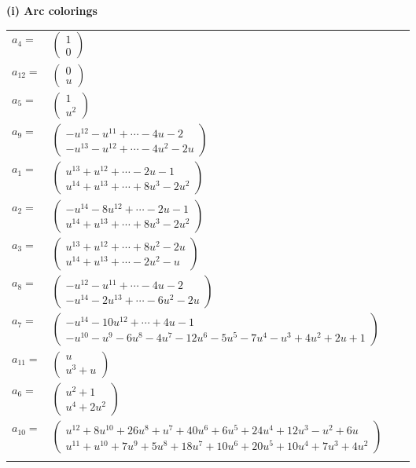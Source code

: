 \documentclass[1p]{elsarticle_modified}
\theoremstyle{definition}
\begin{document}
\flushleft \textbf{(i) Arc colorings}\\
\begin{tabular}{m{7pt} m{180pt} m{7pt} m{180pt} }
\flushright $a_{4}=$&$\begin{pmatrix}1\\0\end{pmatrix}$ \\
\flushright $a_{12}=$&$\begin{pmatrix}0\\u\end{pmatrix}$ \\
\flushright $a_{5}=$&$\begin{pmatrix}1\\u^2\end{pmatrix}$ \\
\flushright $a_{9}=$&$\begin{pmatrix}- u^{12}- u^{11}+\cdots-4 u-2\\- u^{13}- u^{12}+\cdots-4 u^2-2 u\end{pmatrix}$ \\
\flushright $a_{1}=$&$\begin{pmatrix}u^{13}+u^{12}+\cdots-2 u-1\\u^{14}+u^{13}+\cdots+8 u^3-2 u^2\end{pmatrix}$ \\
\flushright $a_{2}=$&$\begin{pmatrix}- u^{14}-8 u^{12}+\cdots-2 u-1\\u^{14}+u^{13}+\cdots+8 u^3-2 u^2\end{pmatrix}$ \\
\flushright $a_{3}=$&$\begin{pmatrix}u^{13}+u^{12}+\cdots+8 u^2-2 u\\u^{14}+u^{13}+\cdots-2 u^2- u\end{pmatrix}$ \\
\flushright $a_{8}=$&$\begin{pmatrix}- u^{12}- u^{11}+\cdots-4 u-2\\- u^{14}-2 u^{13}+\cdots-6 u^2-2 u\end{pmatrix}$ \\
\flushright $a_{7}=$&$\begin{pmatrix}- u^{14}-10 u^{12}+\cdots+4 u-1\\- u^{10}- u^9-6 u^8-4 u^7-12 u^6-5 u^5-7 u^4- u^3+4 u^2+2 u+1\end{pmatrix}$ \\
\flushright $a_{11}=$&$\begin{pmatrix}u\\u^3+u\end{pmatrix}$ \\
\flushright $a_{6}=$&$\begin{pmatrix}u^2+1\\u^4+2 u^2\end{pmatrix}$ \\
\flushright $a_{10}=$&$\begin{pmatrix}u^{12}+8 u^{10}+26 u^8+u^7+40 u^6+6 u^5+24 u^4+12 u^3- u^2+6 u\\u^{11}+u^{10}+7 u^9+5 u^8+18 u^7+10 u^6+20 u^5+10 u^4+7 u^3+4 u^2\end{pmatrix}$\\&\end{tabular}
\end{document}
